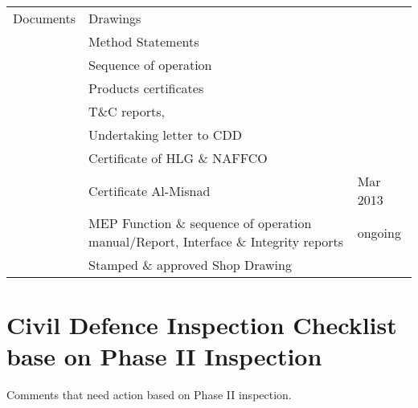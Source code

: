 {\begin{longtable}{p{2.3cm}p{4.2cm}p{4.2cm}}
Documents	&Drawings &\\
	&Method Statements &\ch \\
	&Sequence of operation &\ch \\
	&Products certificates &\ch \\
	&T\&C reports, &\\
	&Undertaking letter to CDD &\\
	&Certificate of HLG \& NAFFCO &\\
        & Certificate Al-Misnad              &\ch 9 Mar 2013\\
	&MEP Function \& sequence of operation manual/Report, Interface \& Integrity reports &ongoing\\
	&Stamped \& approved Shop Drawing &\ch \\
\bottomrule
\end{longtable}
}

\section{Civil Defence Inspection Checklist base on Phase II Inspection}

Comments that need action based on Phase II inspection.







